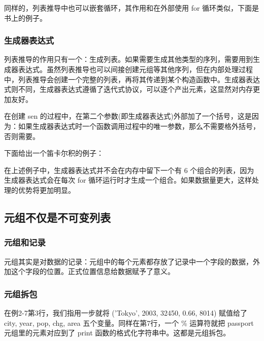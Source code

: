 同样的，列表推导中也可以嵌套循环，其作用和在外部使用 for 循环类似，下面是书上的例子。



\subsubsection{生成器表达式}

列表推导的作用只有一个：生成列表。如果需要生成其他类型的序列，需要用到生成器表达式。虽然列表推导也可以间接创建元组等其他序列，但在内部处理过程中，列表推导会创建一个完整的列表，再将其传递到某个构造函数中。生成器表达式则不同，生成器表达式遵循了迭代式协议，可以逐个产出元素，这显然对内存更加友好。



在创建 sen 的过程中，在第二个参数(即生成器表达式)外部加了一个括号，这是因为：如果生成器表达式时一个函数调用过程中的唯一参数，那么不需要格外括号，否则需要。

下面给出一个笛卡尔积的例子：



在上述例子中，生成器表达式并不会在内存中留下一个有 6 个组合的列表，因为生成器表达式会在每次 for 循环运行时才生成一个组合。如果数据量更大，这样处理的优势将更加明显。

\subsection{元组不仅是不可变列表}
\subsubsection{元组和记录}

元组其实是对数据的记录：元组中的每个元素都存放了记录中一个字段的数据，外加这个字段的位置。正式位置信息给数据赋予了意义。



\subsubsection{元组拆包}
 
在例2-7第3行，我们指用一步就将 ('Tokyo', 2003, 32450, 0.66, 8014) 赋值给了 city, year, pop, chg, area 五个变量。同样在第7行，一个 \% 运算符就把 passport 元组里的元素对应到了 print 函数的格式化字符串中。这都是元组拆包。

